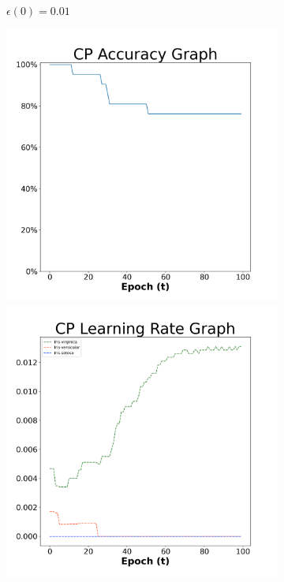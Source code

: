 \begin{figure}[H]
\begin{subfigure}{0.3\textwidth}
  \caption{$\epsilon(0)=0.01$}
\end{subfigure}\hfil %
\begin{subfigure}{0.3\textwidth}
  \includegraphics[width=\linewidth]{images/exper1/iris/CP_0.03_acc.png}
  \includegraphics[width=\linewidth]{images/exper1/iris/CP_0.03_lr.png}

\end{subfigure}
\end{figure}
